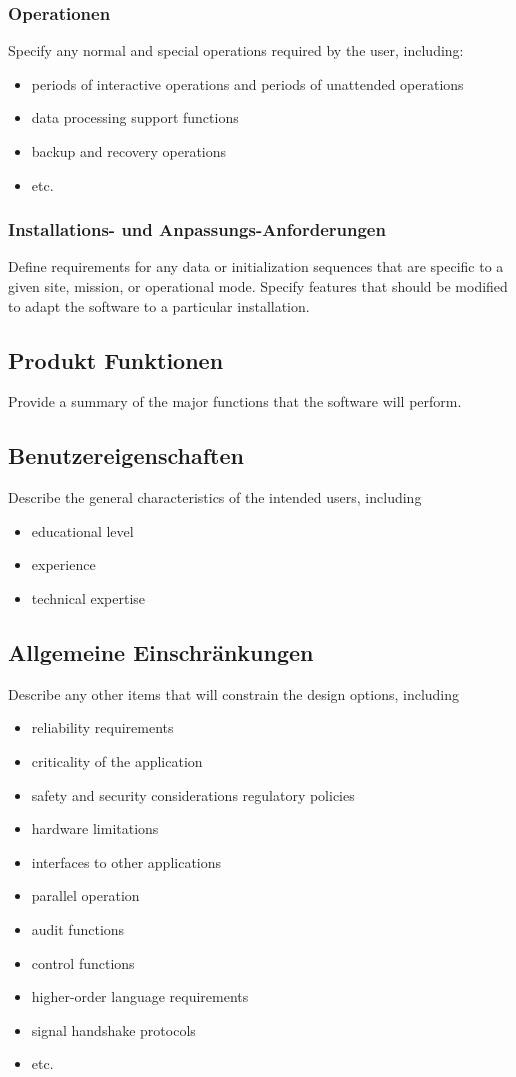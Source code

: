 \subsubsection{Operationen}
Specify any normal and special operations required by the user, including:
\begin{itemize}
	\item periods of interactive operations and periods of unattended operations
	\item data processing support functions
	\item backup and recovery operations
	\item etc.
\end{itemize}

\subsubsection{Installations- und Anpassungs-Anforderungen}
Define requirements for any data or initialization sequences that are specific to a given site, mission, or operational mode. Specify features that should be modified to adapt the software to a particular installation.

\subsection{Produkt Funktionen}
Provide a summary of the major functions that the software will perform.

\subsection{Benutzereigenschaften}
Describe the general characteristics of the intended users, including
\begin{itemize}
	\item educational level
	\item experience
	\item technical expertise
\end{itemize}

\subsection{Allgemeine Einschränkungen}
Describe any other items that will constrain the design options, including
\begin{itemize}
	\item reliability requirements
	\item criticality of the application
	\item safety and security considerations regulatory policies
	\item hardware limitations
	\item interfaces to other applications
	\item parallel operation
	\item audit functions
	\item control functions
	\item higher-order language requirements
	\item signal handshake protocols
	\item etc.
\end{itemize}


